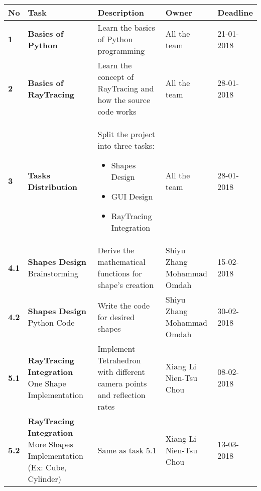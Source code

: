 \documentclass{article}
\begin{document}
\begin{center}
\hspace*{-3cm}
\begin{tabular}{|lp{4.5cm}p{5cm}p{3.5cm}l|}

\hline
\textbf{No} & \textbf{Task} & \textbf{Description} & \textbf{Owner} & \textbf{Deadline} \\
\hline
\textbf{1} & \textbf{Basics of Python} & Learn the basics of Python programming & All the team & 21-01-2018 \\

\textbf{2} &	\textbf{Basics of RayTracing} & Learn the concept of RayTracing and how the source code works & All the team & 28-01-2018 \\

\textbf{3} & \textbf{Tasks Distribution} & Split the project into three tasks:
\begin{itemize}
\item Shapes Design
\item GUI Design
\item RayTracing Integration
\end{itemize} & All the team & 28-01-2018 \\

\textbf{4.1} & \textbf{Shapes Design} \newline Brainstorming & Derive the mathematical functions for shape's creation & Shiyu Zhang \newline Mohammad Omdah & 15-02-2018 \\

\textbf{4.2} & \textbf{Shapes Design} \newline Python Code & Write the code for desired shapes & Shiyu Zhang \newline Mohammad Omdah & 30-02-2018 \\

\textbf{5.1} & \textbf{RayTracing Integration} \newline One Shape Implementation & Implement Tetrahedron with different camera points and reflection rates & Xiang Li \newline Nien-Tsu Chou & 08-02-2018 \\

\textbf{5.2} & \textbf{RayTracing Integration} \newline More Shapes Implementation (Ex: Cube, Cylinder) & Same as task 5.1 & Xiang Li \newline Nien-Tsu Chou & 13-03-2018 \\


\end{tabular}
\end{center}
\end{document}
